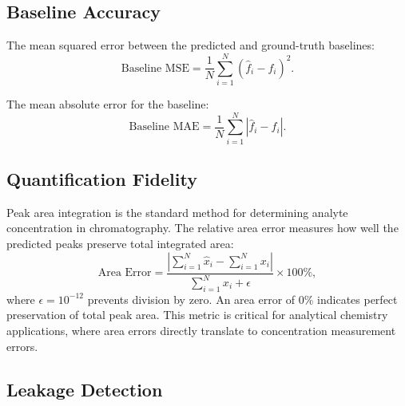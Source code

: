 \subsection{Baseline Accuracy}
\label{sec:exp_metrics_baseline}

 The mean squared error between the predicted and ground-truth baselines:
\begin{equation}
    \text{Baseline MSE} = \frac{1}{N} \sum_{i=1}^{N} (\hat{f}_i - f_i)^2.
    \label{eq:baseline_mse}
\end{equation}

 The mean absolute error for the baseline:
\begin{equation}
    \text{Baseline MAE} = \frac{1}{N} \sum_{i=1}^{N} |\hat{f}_i - f_i|.
    \label{eq:baseline_mae}
\end{equation}


\subsection{Quantification Fidelity}
\label{sec:exp_metrics_quant}

 Peak area integration is the standard method for determining analyte concentration in chromatography. The relative area error measures how well the predicted peaks preserve total integrated area:
\begin{equation}
    \text{Area Error} = \frac{\left|\sum_{i=1}^{N} \hat{x}_i - \sum_{i=1}^{N} x_i\right|}{\sum_{i=1}^{N} x_i + \epsilon} \times 100\%,
    \label{eq:area_error}
\end{equation}
where $\epsilon = 10^{-12}$ prevents division by zero. An area error of 0\% indicates perfect preservation of total peak area. This metric is critical for analytical chemistry applications, where area errors directly translate to concentration measurement errors.


\subsection{Leakage Detection}
\label{sec:exp_metrics_leakage}

